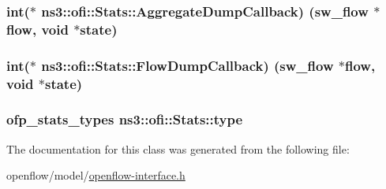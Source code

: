 \subsubsection[{\texorpdfstring{Aggregate\+Dump\+Callback}{AggregateDumpCallback}}]{\setlength{\rightskip}{0pt plus 5cm}int($\ast$ ns3\+::ofi\+::\+Stats\+::\+Aggregate\+Dump\+Callback) (sw\+\_\+flow $\ast$flow, void $\ast$state)\hspace{0.3cm}{\ttfamily [private]}}\hypertarget{classns3_1_1ofi_1_1Stats_a25e3a9d6d6a7680186abb694771ff2cb}{}\label{classns3_1_1ofi_1_1Stats_a25e3a9d6d6a7680186abb694771ff2cb}
\subsubsection[{\texorpdfstring{Flow\+Dump\+Callback}{FlowDumpCallback}}]{\setlength{\rightskip}{0pt plus 5cm}int($\ast$ ns3\+::ofi\+::\+Stats\+::\+Flow\+Dump\+Callback) (sw\+\_\+flow $\ast$flow, void $\ast$state)\hspace{0.3cm}{\ttfamily [private]}}\hypertarget{classns3_1_1ofi_1_1Stats_aed4cbfd41c8b6d0ab31e101e6f27e5be}{}\label{classns3_1_1ofi_1_1Stats_aed4cbfd41c8b6d0ab31e101e6f27e5be}
\subsubsection[{\texorpdfstring{type}{type}}]{\setlength{\rightskip}{0pt plus 5cm}ofp\+\_\+stats\+\_\+types ns3\+::ofi\+::\+Stats\+::type}\hypertarget{classns3_1_1ofi_1_1Stats_adefe53a23eb40994d5e5122a40a18608}{}\label{classns3_1_1ofi_1_1Stats_adefe53a23eb40994d5e5122a40a18608}


The documentation for this class was generated from the following file\+:\begin{DoxyCompactItemize}
\item 
openflow/model/\hyperlink{openflow-interface_8h}{openflow-\/interface.\+h}\end{DoxyCompactItemize}
